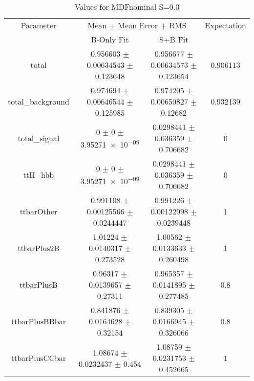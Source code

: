 \begin{table}
\centering
\caption{Values for MDFnominal S=0.0}
\begin{tabular}{cccc}
\toprule
Parameter & \multicolumn{2}{c}{Mean $\pm$ Mean Error $\pm$ RMS} & Expectation\\
 & B-Only Fit & S+B Fit & \\
\midrule
total & \num{0.956603} $\pm$ \num{0.00634543} $\pm$ \num{0.123648} & \num{0.956677} $\pm$ \num{0.00634573} $\pm$ \num{0.123654} & \num{0.906113}\\
total\_background & \num{0.974694} $\pm$ \num{0.00646544} $\pm$ \num{0.125985} & \num{0.974205} $\pm$ \num{0.00650827} $\pm$ \num{0.12682} & \num{0.932139}\\
total\_signal & \num{0} $\pm$ \num{0} $\pm$ \num{3.95271e-09} & \num{0.0298441} $\pm$ \num{0.036359} $\pm$ \num{0.706682} & \num{0}\\
ttH\_hbb & \num{0} $\pm$ \num{0} $\pm$ \num{3.95271e-09} & \num{0.0298441} $\pm$ \num{0.036359} $\pm$ \num{0.706682} & \num{0}\\
ttbarOther & \num{0.991108} $\pm$ \num{0.00125566} $\pm$ \num{0.0244447} & \num{0.991226} $\pm$ \num{0.00122998} $\pm$ \num{0.0239448} & \num{1}\\
ttbarPlus2B & \num{1.01224} $\pm$ \num{0.0140317} $\pm$ \num{0.273528} & \num{1.00562} $\pm$ \num{0.0133633} $\pm$ \num{0.260498} & \num{1}\\
ttbarPlusB & \num{0.96317} $\pm$ \num{0.0139657} $\pm$ \num{0.27311} & \num{0.965357} $\pm$ \num{0.0141895} $\pm$ \num{0.277485} & \num{0.8}\\
ttbarPlusBBbar & \num{0.841876} $\pm$ \num{0.0164628} $\pm$ \num{0.32154} & \num{0.839305} $\pm$ \num{0.0166945} $\pm$ \num{0.326066} & \num{0.8}\\
ttbarPlusCCbar & \num{1.08674} $\pm$ \num{0.0232437} $\pm$ \num{0.454} & \num{1.08759} $\pm$ \num{0.0231753} $\pm$ \num{0.452665} & \num{1}\\
\bottomrule
\end{tabular}
\end{table}